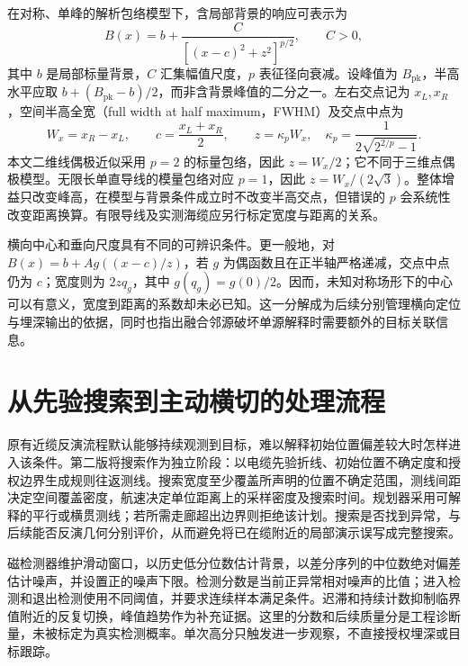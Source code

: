 在对称、单峰的解析包络模型下，含局部背景的响应可表示为
\begin{equation}
 B(x)=b+\frac{C}{[(x-c)^2+z^2]^{p/2}},\qquad C>0,
 \label{eq:middle-mag-profile}
\end{equation}
其中 $b$ 是局部标量背景，$C$ 汇集幅值尺度，$p$ 表征径向衰减。设峰值为 $B_{\mathrm{pk}}$，半高水平应取 $b+(B_{\mathrm{pk}}-b)/2$，而非含背景峰值的二分之一。左右交点记为 $x_L,x_R$，空间半高全宽（full width at half maximum，FWHM）及交点中点为
\begin{equation}
 W_x=x_R-x_L,\qquad
 \hat c=\frac{x_L+x_R}{2},\qquad
 z=\kappa_p W_x,\quad
 \kappa_p=\frac{1}{2\sqrt{2^{2/p}-1}}.
 \label{eq:middle-mag-width}
\end{equation}
本文二维线偶极近似采用 $p=2$ 的标量包络，因此 $z=W_x/2$；它不同于三维点偶极模型。无限长单直导线的模量包络对应 $p=1$，因此 $z=W_x/(2\sqrt{3})$。整体增益只改变峰高，在模型与背景条件成立时不改变半高交点，但错误的 $p$ 会系统性改变距离换算。有限导线及实测海缆应另行标定宽度与距离的关系。

横向中心和垂向尺度具有不同的可辨识条件。更一般地，对 $B(x)=b+A g((x-c)/z)$，若 $g$ 为偶函数且在正半轴严格递减，交点中点仍为 $c$；宽度则为 $2zq_g$，其中 $g(q_g)=g(0)/2$。因而，未知对称场形下的中心可以有意义，宽度到距离的系数却未必已知。这一分解成为后续分别管理横向定位与埋深输出的依据，同时也指出融合邻源破坏单源解释时需要额外的目标关联信息。

\section{从先验搜索到主动横切的处理流程}
\label{sec:middle-mag-workflow}

原有近缆反演流程默认能够持续观测到目标，难以解释初始位置偏差较大时怎样进入该条件。第二版将搜索作为独立阶段：以电缆先验折线、初始位置不确定度和授权边界生成规则往返测线。搜索宽度至少覆盖所声明的位置不确定范围，测线间距决定空间覆盖密度，航速决定单位距离上的采样密度及搜索时间。规划器采用可解释的平行或横贯测线；若所需走廊超出边界则拒绝该计划。搜索是否找到异常，与后续能否反演几何分别评价，从而避免将已在缆附近的局部演示误写成完整搜索。

磁检测器维护滑动窗口，以历史低分位数估计背景，以差分序列的中位数绝对偏差估计噪声，并设置正的噪声下限。检测分数是当前正异常相对噪声的比值；进入检测和退出检测使用不同阈值，并要求连续样本满足条件。迟滞和持续计数抑制临界值附近的反复切换，峰值趋势作为补充证据。这里的分数和后续质量分是工程诊断量，未被标定为真实检测概率。单次高分只触发进一步观察，不直接授权埋深或目标跟踪。

